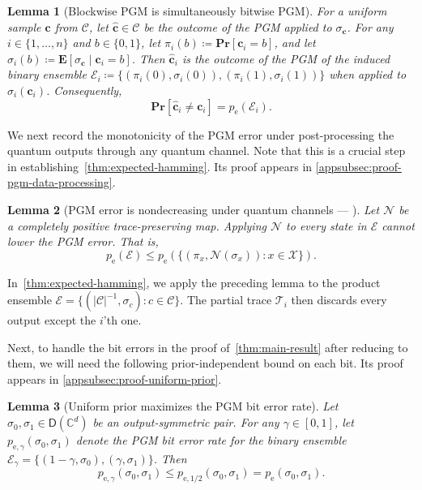 \documentclass[11pt]{article}
\renewcommand{\leq}{\leqslant}
\newtheorem{lemma}[lemma]{Lemma}
\theoremstyle{remark}
\newcommand{\cC}{\mathcal{C}}
\newcommand{\cX}{\mathcal{X}}
\newcommand{\cE}{\mathcal{E}}
\newcommand{\T}{\mathcal{T}}
\newcommand{\C}{\mathbb{C}}
\newcommand{\Dens}{\mathsf{D}}
\newcommand{\Eb}{\mathbf{E}}
\newcommand{\Prb}{\mathbf{Pr}}
\newcommand{\bits}{\{0,1\}}
\newcommand{\bchat}{\hat{\mathbf{c}}}
\newcommand{\bc}{\mathbf{c}}
\newcommand{\abs}[1]{\left|#1\right|}
\newcommand{\N}{\mathcal{N}}
\begin{document}
\begin{lemma}[Blockwise PGM is simultaneously bitwise PGM]
\label{lem:block-pgm-bitwise}
For a uniform sample $\bc$ from $\cC$, let $\bchat \in \cC$ be the outcome of the PGM applied to $\sigma_{\bc}$. For any $i \in \{1, \ldots , n\}$ and $b \in \bits$, let $\pi_i(b) \coloneqq \Prb[\bc_i = b]$, and let $\sigma_i(b) \coloneqq \Eb[\sigma_\bc \mid \bc_i = b]$. Then $\bchat_i$ is the outcome of the PGM of the induced binary ensemble $\cE_i \coloneqq \{(\pi_i(0),\sigma_i(0)), (\pi_i(1),\sigma_i(1))\}$ when applied to $\sigma_i(\bc_i)$. Consequently,
\begin{equation*}
\Prb[\bchat_i \neq \bc_i] = p_{\mathrm{e}}(\cE_i).
\end{equation*}
\end{lemma}

We next record the monotonicity of the PGM error under post-processing the quantum outputs through any quantum channel. Note that this is a crucial step in establishing~\cref{thm:expected-hamming}. Its proof appears in \cref{appsubsec:proof-pgm-data-processing}.

\begin{lemma}[{PGM error is nondecreasing under quantum channels --- \cite[Section~11.5]{Ren22}}]
\label{lem:pgm-data-processing}
Let $\N$ be a completely positive trace-preserving map. Applying $\N$ to every state in $\cE$ cannot lower the PGM error. That is, 
\begin{equation*}
p_{\mathrm{e}}(\cE) \leq p_{\mathrm{e}}\left(\{(\pi_x,\N(\sigma_x)) : x \in \cX\}\right).
\end{equation*}
\end{lemma}

In~\cref{thm:expected-hamming}, we apply the preceding lemma to the product ensemble $\cE = \{(\abs{\cC}^{-1}, \sigma_c) : c \in \cC\}$. The partial trace $\T_i$ then discards every output except the $i$'th one.

Next, to handle the bit errors in the proof of~\cref{thm:main-result} after reducing to them, we will need the following prior-independent bound on each bit. Its proof appears in \cref{appsubsec:proof-uniform-prior}.

\begin{lemma}[Uniform prior maximizes the PGM bit error rate]
\label{lem:uniform-prior-worst}
Let $\sigma_0,\sigma_1 \in \Dens(\C^d)$ be an output-symmetric pair. For any $\gamma \in [0,1]$, let $p_{\mathrm{e},\gamma}(\sigma_0,\sigma_1)$ denote the PGM bit error rate for the binary ensemble $\cE_\gamma = \{(1-\gamma,\sigma_0),(\gamma,\sigma_1)\}$. Then
\begin{equation*}
p_{\mathrm{e},\gamma}(\sigma_0,\sigma_1) \leq p_{\mathrm{e},1/2}(\sigma_0,\sigma_1) = p_{\mathrm{e}}(\sigma_0,\sigma_1).
\end{equation*}
\end{lemma}
\end{document}
